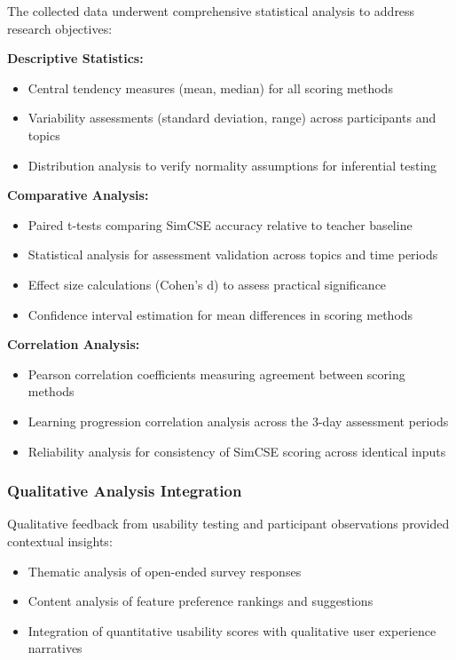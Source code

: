 The collected data underwent comprehensive statistical analysis to address research objectives:

\textbf{Descriptive Statistics:}
\begin{itemize}
    \item Central tendency measures (mean, median) for all scoring methods
    \item Variability assessments (standard deviation, range) across participants and topics
    \item Distribution analysis to verify normality assumptions for inferential testing
\end{itemize}

\textbf{Comparative Analysis:}
\begin{itemize}
    \item Paired t-tests comparing SimCSE accuracy relative to teacher baseline
    \item Statistical analysis for assessment validation across topics and time periods
    \item Effect size calculations (Cohen's d) to assess practical significance
    \item Confidence interval estimation for mean differences in scoring methods
\end{itemize}

\textbf{Correlation Analysis:}
\begin{itemize}
    \item Pearson correlation coefficients measuring agreement between scoring methods
    \item Learning progression correlation analysis across the 3-day assessment periods
    \item Reliability analysis for consistency of SimCSE scoring across identical inputs
\end{itemize}

\subsubsection{Qualitative Analysis Integration}

Qualitative feedback from usability testing and participant observations provided contextual insights:
\begin{itemize}
    \item Thematic analysis of open-ended survey responses
    \item Content analysis of feature preference rankings and suggestions
    \item Integration of quantitative usability scores with qualitative user experience narratives
\end{itemize}

